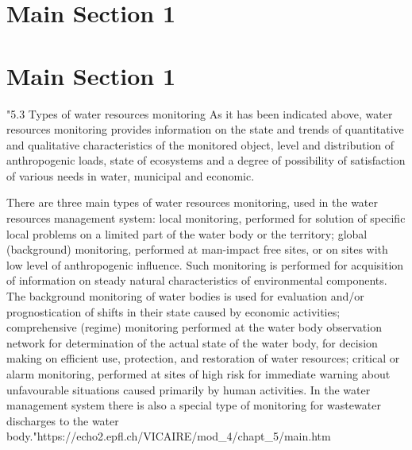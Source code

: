 
\section{Main Section 1}


\section{Main Section 1}




"5.3 Types of water resources monitoring
As it has been indicated above, water resources monitoring provides information on the state and trends of quantitative and qualitative characteristics of the monitored object, level and distribution of anthropogenic loads, state of ecosystems and a degree of possibility of satisfaction of various needs in water, municipal and economic.

There are three main types of water resources monitoring, used in the water resources management system:
local monitoring, performed for solution of specific local problems on a limited part of the water body or the territory;
global (background) monitoring, performed at man-impact free sites, or on sites with low level of anthropogenic influence. Such monitoring is performed for acquisition of information on steady natural characteristics of environmental components. The background monitoring of water bodies is used for evaluation and/or prognostication of shifts in their state caused by economic activities;
comprehensive (regime) monitoring performed at the water body observation network for determination of the actual state of the water body, for decision making on efficient use, protection, and restoration of water resources;
critical or alarm monitoring, performed at sites of high risk for immediate warning about unfavourable situations caused primarily by human activities.
In the water management system there is also a special type of monitoring for wastewater discharges to the water body."https://echo2.epfl.ch/VICAIRE/mod_4/chapt_5/main.htm


